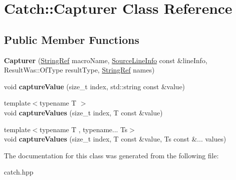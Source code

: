 \hypertarget{classCatch_1_1Capturer}{}\section{Catch\+::Capturer Class Reference}
\label{classCatch_1_1Capturer}
\subsection*{Public Member Functions}
\begin{DoxyCompactItemize}
\item 
\mbox{\label{classCatch_1_1Capturer_a86b0b27acc803a4e1310c10820f3038f}} 
{\bfseries Capturer} (\mbox{\hyperlink{classCatch_1_1StringRef}{String\+Ref}} macro\+Name, \mbox{\hyperlink{structCatch_1_1SourceLineInfo}{Source\+Line\+Info}} const \&line\+Info, Result\+Was\+::\+Of\+Type result\+Type, \mbox{\hyperlink{classCatch_1_1StringRef}{String\+Ref}} names)
\item 
\mbox{\label{classCatch_1_1Capturer_a0695ebf77f7cdcb344c73bcb3d9131e4}} 
void {\bfseries capture\+Value} (size\+\_\+t index, std\+::string const \&value)
\item 
\mbox{\label{classCatch_1_1Capturer_a60d08e6db2e54740bb2298bbbec3bc0b}} 
{\footnotesize template$<$typename T $>$ }\\void {\bfseries capture\+Values} (size\+\_\+t index, T const \&value)
\item 
\mbox{\label{classCatch_1_1Capturer_a76f2a097cfeb3042688300b81eb9bcbc}} 
{\footnotesize template$<$typename T , typename... Ts$>$ }\\void {\bfseries capture\+Values} (size\+\_\+t index, T const \&value, Ts const \&... values)
\end{DoxyCompactItemize}


The documentation for this class was generated from the following file\+:\begin{DoxyCompactItemize}
\item 
catch.\+hpp\end{DoxyCompactItemize}
